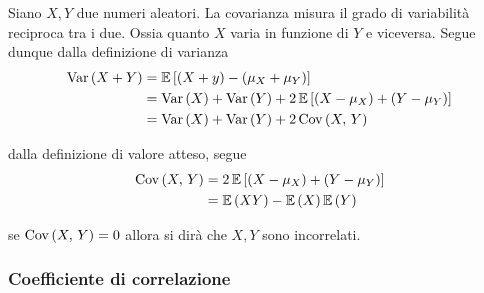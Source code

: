 \documentclass{subfiles}
\begin{document}
Siano \(X, Y\) due numeri aleatori. La covarianza misura il grado di variabilità reciproca tra i due.
Ossia quanto \(X\) varia in funzione di \(Y\) e viceversa.
Segue dunque dalla definizione di varianza
\[\begin{aligned}
        \Var{X + Y} & = \Expected*{(X + y) - (\mu_{X} + \mu_{Y})}                      \\
                    & = \Var{X} + \Var{Y} + 2\Expected*{(X - \mu_{X}) + (Y - \mu_{Y})} \\
                    & = \Var{X} + \Var{Y} + 2 \Cov{X}{Y}
    \end{aligned}\]
\begin{Remark*}
    dalla definizione di valore atteso, segue
    \[\begin{aligned}
            \Cov{X}{Y} & = 2\Expected*{(X - \mu_{X}) + (Y - \mu_{Y})} \\
                       & =\Expected{XY} - \Expected{X}\Expected{Y}
        \end{aligned}\]
\end{Remark*}
\begin{Note*}
    se \(\operatorname{Cov} \left(X, \, Y\right) = 0\) allora si dirà che \(X, Y\) sono incorrelati.
\end{Note*}

\subsubsection{Coefficiente di correlazione}

\end{document}
